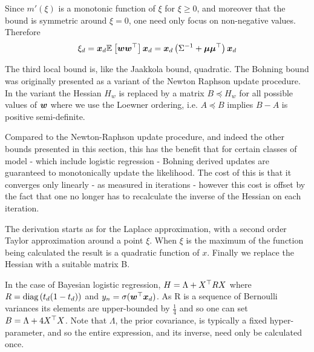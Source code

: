 Since $m'(\xi)$ is a monotonic function of $\xi$ for $\xi \geq 0$, and moreover that the bound is symmetric around $\xi = 0$, one need only focus on non-negative values. Therefore
\begin{align}
\xi_d = \bm x_d \mathbb{E}_{ {  } }\left[ \bm w \bm w^\top  \right] \bm x_d = \bm x_d \left( {\Sigma}^{-1} + \bm \mu \bm \mu^\top \right) \bm x_d
\end{align}

The third local bound is, like the Jaakkola bound, quadratic. The Bohning bound  was originally presented \cite{Bohning1988a} as a variant of the Newton Raphson update procedure. In the variant the Hessian $H_w$ is replaced by a matrix $B \preceq H_w$ for all possible values of $\bm w$ where we use the Loewner ordering, i.e. $A \preceq B$ implies $B - A$ is positive semi-definite.

Compared to the Newton-Raphson update procedure, and indeed the other bounds presented in this section, this has the benefit that for certain classes of model - which include logistic regression - Bohning derived updates are guaranteed to monotonically update the likelihood. The cost of this is that it converges only linearly - as measured in iterations - however this cost is offset by the fact that one no longer has to recalculate the inverse of the Hessian on each iteration.

The derivation starts as for the Laplace approximation, with a second order Taylor approximation around a point $\xi$. When $\xi$ is the maximum of the function being calculated the result is a quadratic function of $x$. Finally we replace the Hessian with a suitable matrix B.

%

In the case of Bayesian logistic regression, $H = \Lambda + X^\top R X$ where $R = \text{diag} \left( {t_d (1-t_d)} \right)$ and $y_n = \sigma(\bm w^\top\bm x_d)$. As R is a sequence of Bernoulli variances its elements are upper-bounded by $\frac{1}{4}$ and so one can set $B = \Lambda + 4 X^\top X$. Note that $\Lambda$, the prior covariance, is typically a fixed hyper-parameter, and so the entire expression, and its inverse, need only be calculated once.


